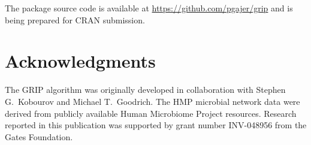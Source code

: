 The package source code is available at
\url{https://github.com/pgajer/grip} and is being prepared for CRAN
submission.

\section{Acknowledgments}\label{sec:acknowledgments}

The GRIP algorithm was originally developed in collaboration with
Stephen G.\ Kobourov and Michael T.\ Goodrich. The HMP microbial
network data were derived from publicly available Human Microbiome
Project resources. Research reported in this publication was supported
by grant number INV-048956 from the Gates Foundation.



\address{%
Pawel Gajer\\
Center for Advanced Microbiome Research and Innovation (CAMRI),
Institute for Genome Sciences, Department of Microbiology and
Immunology, University of Maryland School of Medicine\\%
Baltimore, Maryland, USA\\
%
\href{mailto:pgajer@gmail.com}{\nolinkurl{pgajer@gmail.com}}%
}

\address{%
Jacques Ravel\\
Center for Advanced Microbiome Research and Innovation (CAMRI),
Institute for Genome Sciences, Department of Microbiology and
Immunology, University of Maryland School of Medicine\\%
Baltimore, Maryland, USA\\
%
}
